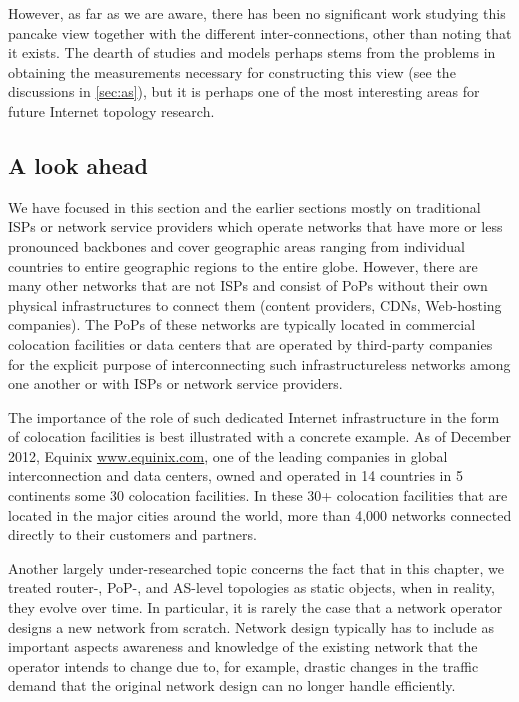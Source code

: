 However, as far as we are aware, there has been no significant work
studying this pancake view together with the different inter-connections, 
other than noting that it exists. The dearth of studies and models perhaps 
stems from the problems in obtaining the measurements necessary for constructing
this view (see the discussions in \autoref{sec:as}), but it is
perhaps one of the most interesting areas for future Internet topology research.
 

\subsection{A look ahead}

We have focused in this section and the earlier sections mostly on traditional ISPs
or network service providers which operate networks that have more or
less pronounced backbones and cover geographic areas ranging from 
individual countries to entire geographic regions to the entire globe.
However, there are many other networks that are not ISPs and consist of PoPs
without their own physical infrastructures to connect them (\eg content
providers, CDNs, Web-hosting companies). The PoPs of these networks are
typically located in commercial colocation facilities or data centers
that are operated by third-party companies for the explicit purpose of 
interconnecting such infrastructureless networks among one another or 
with ISPs or network service providers. 

The importance of the role of such dedicated Internet infrastructure
in the form of colocation facilities is best illustrated with a
concrete example.  As of December 2012, Equinix \url{www.equinix.com},
one of the leading companies in global interconnection and data
centers, owned and operated in 14 countries in 5 continents some 30
colocation facilities. In these 30+ colocation facilities that are
located in the major cities around the world, more than 4,000 networks
connected directly to their customers and partners.

Another largely under-researched topic concerns the fact that in this chapter,
we treated router-, PoP-, and AS-level topologies as static objects, when in
reality, they evolve over time.  In particular, it is rarely the case that
a network operator designs a new network from scratch.  Network design typically
has to include as important aspects awareness and knowledge of the 
existing network that the operator intends to change due to, for example,
drastic changes in the traffic demand that the original network design can
no longer handle efficiently.

